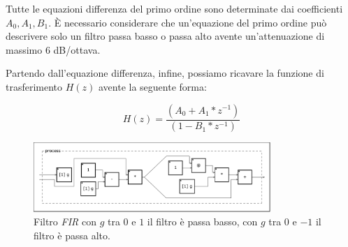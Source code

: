 Tutte le equazioni differenza del primo ordine sono determinate dai
coefficienti $A_0,A_1,B_1$. È necessario considerare che un’equazione del primo
ordine può descrivere solo un filtro passa basso o passa alto avente
un’attenuazione di massimo 6 dB/ottava.

Partendo dall’equazione differenza, infine, possiamo ricavare la funzione di
trasferimento $H(z)$ avente la seguente forma:

\begin{equation}
H(z)=\frac{(A_0 + A_1 * z^{-1})} {(1-B_1 * z^{-1})}
\end{equation}



\begin{figure}[htp]
\centering
\includegraphics[width=0.80\textwidth]{Code/fir-svg/process.pdf}
\caption{Filtro \emph{FIR} con $g$ tra $0$ e $1$ il filtro è passa basso,
         con $g$ tra $0$ e $-1$ il filtro è passa alto.}
\label{fig:fir}
\end{figure}





